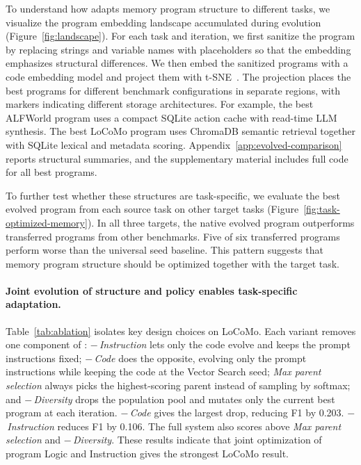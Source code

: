 To understand how \sysname{} adapts memory program structure to different tasks, we visualize the program embedding landscape accumulated during evolution (Figure~\ref{fig:landscape}).
For each task and iteration, we first sanitize the program by replacing strings and variable names with placeholders so that the embedding emphasizes structural differences.
We then embed the sanitized programs with a code embedding model and project them with t-SNE~\citep{vandermaaten2008tsne}.
The projection places the best programs for different benchmark configurations in separate regions, with markers indicating different storage architectures.
For example, the best ALFWorld program uses a compact SQLite action cache with read-time LLM synthesis.
The best LoCoMo program uses ChromaDB semantic retrieval together with SQLite lexical and metadata scoring.
Appendix~\ref{app:evolved-comparison} reports structural summaries, and the supplementary material includes full code for all best programs.



To further test whether these structures are task-specific, we evaluate the best evolved program from each source task on other target tasks (Figure~\ref{fig:task-optimized-memory}).
In all three targets, the native evolved program outperforms transferred programs from other benchmarks.
Five of six transferred programs perform worse than the universal seed baseline.
This pattern suggests that memory program structure should be optimized together with the target task.


\paragraph{Joint evolution of structure and policy enables task-specific adaptation.}
Table~\ref{tab:ablation} isolates key design choices on LoCoMo.
Each variant removes one component of \sysname{}: \textit{$-$\,Instruction} lets only the code evolve and keeps the prompt instructions fixed; \textit{$-$\,Code} does the opposite, evolving only the prompt instructions while keeping the code at the Vector Search seed; \textit{Max parent selection} always picks the highest-scoring parent instead of sampling by softmax; and \textit{$-$\,Diversity} drops the population pool and mutates only the current best program at each iteration.
\textit{$-$\,Code} gives the largest drop, reducing F1 by 0.203.
\textit{$-$\,Instruction} reduces F1 by 0.106.
The full system also scores above \textit{Max parent selection} and \textit{$-$\,Diversity}.
These results indicate that joint optimization of program Logic and Instruction gives the strongest LoCoMo result.


